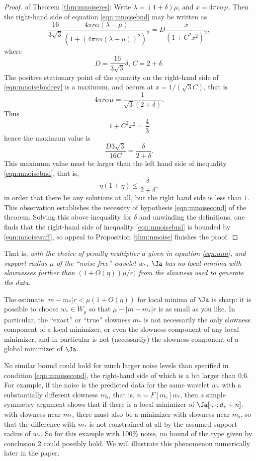 \begin{proof} of Theorem \ref{thm:mnoiseres}:
  Write $\lambda = (1+\delta)\mu$, and $x=4 \pi r \alpha \mu$. Then
  the right-hand side of equation \ref{eqn:mnoisebnd} may be written as
  \begin{equation}
    \label{eqn:mnoisebndrev}
    \frac{16}{3\sqrt{3}}\frac{4\pi r \alpha
      (\lambda-\mu)}{(1+(4\pi r\alpha(\lambda+\mu))^2)^2} = D
    \frac{x}{(1+C^2 x^2)^2},
  \end{equation}
  where
  \[
    D=\frac{16}{3\sqrt{3}}\delta,\,C=2+\delta.
  \]
  The positive stationary point of the quantity on the right-hand side
  of \ref{eqn:mnoisebndrev} is a maximum, and occurs at
  $x=1/(\sqrt{3}C)$, that is
  \[
    4 \pi r \alpha \mu = \frac{1}{\sqrt{3}(2+\delta)}.
  \]
  Thus
  \[
    1+C^2x^2 = \frac{4}{3}
  \]
  hence the maximum value is
  \[
    \frac{D3\sqrt{3}}{16C} = \frac{\delta}{2+\delta}.
  \]
  This maximum value must be larger than the left hand side of inequality
  \ref{eqn:mnoisebnd}, that is,
  \[
    \eta(1+\eta) \le \frac{\delta}{2+\delta},
  \]
  in order that there be any solutions at all, but the right hand side
  is less than $1$. This observation establishes the necessity of
  hypothesis \ref{eqn:mnoisecond} of the
  theorem. Solving this above inequality for $\delta$ and unwinding
  the definitions, one finds that the right-hand side of inequality
  \ref{eqn:mnoisebnd} is bounded by \ref{eqn:mnoisesuff}, so appeal to
  Proposition \ref{thm:mnoise} finishes the proof.
\end{proof}

 That is, {\em with the choice of penalty
  multiplier $a$ given in equation \ref{eqn:ann}, and support radius
  $\mu$ of the ``noise-free'' wavelet $w_*$, $\Ja$ has no local
  minima with slownesses further than $(1+O(\eta))\mu/r)$ from the slowness used to
  generate the data}.

 The estimate $|m-m_*|r<\mu(1+O(\eta))$ for
local minima of $\Ja$ is sharp: it is possible to choose $w_* \in W_{\mu}$
so that $\mu - |m-m_*|r$ is as small as you like. In particular,
the ``exact'' or ``true'' slowness $m_*$ is not necessarily the only
slowness component of a local minimizer, or even the slowness
component of any local minimizer, and in particular
is not (necessarily) the slowness component of a global minimizer of $\Ja$.

 No similar bound could hold for much larger
noise levels than specified in condition \ref{eqn:mnoisecond}, the
right-hand side of which is a bit larger than 0.6. For example, if the noise is
the predicted data for the same wavelet $w_*$ with a substantially different
slowness $m_{\flat}$, that is, $n=F[m_{\flat}]w_*$, then a simple
symmetry argument shows that if there is a local minimizer of $\Ja[\cdot,\cdot;d_*+n]$. with
slowness near $m_*$,
there must also be a minimizer with slowness near $m_{\flat}$.
so that the difference with $m_*$ is not constrained at
all by the assumed support radius of $w_*$. So for this example with 100\% noise, no
bound of the type given by conclusion 2 could possibly hold. We will
illustrate this phenomenon numerically later in the paper.

